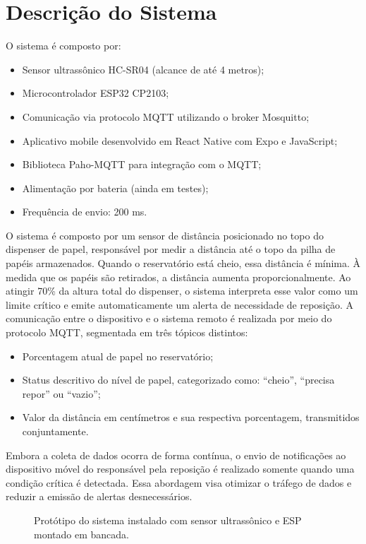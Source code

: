 \documentclass[10pt,conference]{IEEEtran}
\begin{document}
\section{Descrição do Sistema}
O sistema é composto por:
\begin{itemize}
    \item Sensor ultrassônico HC-SR04 (alcance de até 4 metros);
    \item Microcontrolador ESP32 CP2103;
    \item Comunicação via protocolo MQTT utilizando o broker Mosquitto;
    \item Aplicativo mobile desenvolvido em React Native com Expo e JavaScript;
    \item Biblioteca Paho-MQTT para integração com o MQTT;
    \item Alimentação por bateria (ainda em testes);
    \item Frequência de envio: 200 ms.
\end{itemize}

O sistema é composto por um sensor de distância posicionado no topo do dispenser de papel, responsável por medir a distância até o topo da pilha de papéis armazenados. Quando o reservatório está cheio, essa distância é mínima. À medida que os papéis são retirados, a distância aumenta proporcionalmente. Ao atingir 70\% da altura total do dispenser, o sistema interpreta esse valor como um limite crítico e emite automaticamente um alerta de necessidade de reposição.
A comunicação entre o dispositivo e o sistema remoto é realizada por meio do protocolo MQTT, segmentada em três tópicos distintos:
\begin{itemize}
    \item Porcentagem atual de papel no reservatório;
    \item Status descritivo do nível de papel, categorizado como: “cheio”, “precisa repor” ou “vazio”;
    \item Valor da distância em centímetros e sua respectiva porcentagem, transmitidos conjuntamente.
\end{itemize}
Embora a coleta de dados ocorra de forma contínua, o envio de notificações ao dispositivo móvel do responsável pela reposição é realizado somente quando uma condição crítica é detectada. Essa abordagem visa otimizar o tráfego de dados e reduzir a emissão de alertas desnecessários.

 
\begin{figure}[H]
  \centering
  \caption{Protótipo do sistema instalado com sensor ultrassônico e ESP montado em bancada.}
  \label{fig:sistema}
\end{figure}
\end{document}
